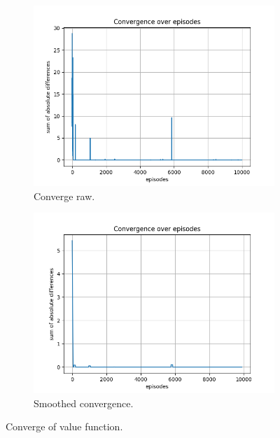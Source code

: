 \documentclass{assignment}
\begin{document}
\begin{figure}[H]
    \begin{subfigure}{0.5\textwidth}
        \includegraphics[width=\textwidth]{figures/convergence_td/gamma_sweep/convergence_TD_alpha_0.1_gamma_0.1_epislon_0.2.png}
    \caption{Converge raw.}
    \end{subfigure}\hfill
    \begin{subfigure}{0.5\textwidth}
        \includegraphics[width=\textwidth]{figures/convergence_td/gamma_sweep/convergence_TD_smoothed_alpha_0.1_gamma_0.1_epislon_0.2.png}
    \caption{Smoothed convergence.}
    \end{subfigure}
    \caption{Converge of value function.}
    \label{fig:gamma_0.1_td_learning_convergence}
\end{figure}
\end{document}
